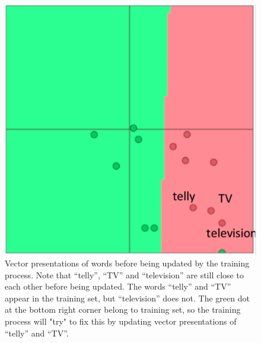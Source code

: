 \begin{figure}[H]
    \centering
    \includegraphics[scale=0.35]{figure/vec-before-update}
    \caption[Word embeddings updating causing over-fitting 1]{Vector presentations of words before being updated by the training process.
    Note that ``telly'', ``TV'' and ``television'' are still close to each other before being updated.
    The words ``telly'' and ``TV'' appear in the training set, but ``television'' does not.
    The green dot at the bottom right corner belong to training set, so the training process will "try" to fix this by updating vector presentations of ``telly'' and ``TV''.
     }
    \label{fig:updating-word-bad-1}
\end{figure}

